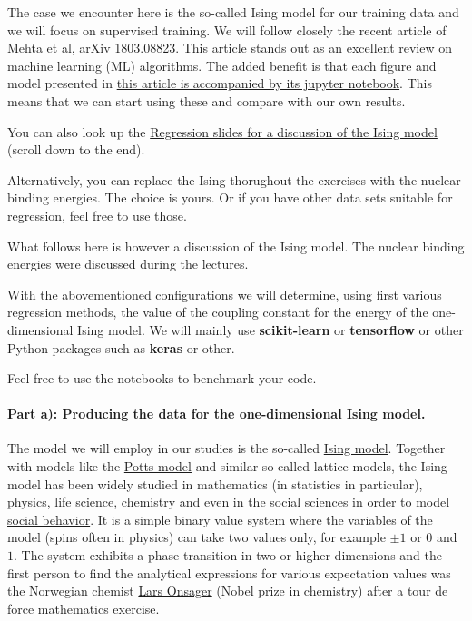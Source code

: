 \documentclass[%
oneside,                 %
final,                   %
10pt]{article}
\begin{document}
The case we encounter here
is  the so-called Ising model for  our training data and we will
focus on supervised training. We will follow closely the recent
article of \href{{https://arxiv.org/abs/1803.08823}}{Mehta et al, arXiv
1803.08823}. This article stands
out as an excellent review on machine learning (ML) algorithms.
The added benefit is that each figure and
model presented in \href{{https://physics.bu.edu/~pankajm/MLnotebooks.html}}{this article is accompanied by its jupyter
notebook}. This
means that we can start using these and compare with our own results.

You can also look up the \href{{https://compphysics.github.io/MachineLearningMSU-FRIB2020/doc/pub/Regression/html/Regression.html}}{Regression slides for a discussion of the Ising model} (scroll down to the end).

Alternatively, you can replace the Ising thorughout the exercises with the nuclear binding energies. The choice is yours. Or if you have other data sets suitable for regression, feel free to use those.

What follows here is however a discussion of the Ising model. The nuclear binding energies were discussed during the lectures.

With the abovementioned configurations we will determine, using first
various regression methods, the value of the coupling constant for the
energy of the one-dimensional Ising model.
We will mainly use \textbf{scikit-learn} or \textbf{tensorflow} or other Python packages such as \textbf{keras} or other.

Feel free to use the notebooks to benchmark your code.  

\paragraph{Part a): Producing the data for the one-dimensional Ising model.}
The model we will employ in our studies is the so-called \href{{https://en.wikipedia.org/wiki/Ising_model}}{Ising
model}.  Together with
models like the \href{{https://en.wikipedia.org/wiki/Potts_model}}{Potts
model} and similar
so-called lattice models, the Ising model has been widely studied in
mathematics (in statistics in particular), physics, \href{{https://journals.aps.org/pre/abstract/10.1103/PhysRevE.93.062402}}{life
science},
chemistry and even in the \href{{https://www.springer.com/gp/book/9781461420316}}{social sciences in order to model social
behavior}. It is a
simple binary value system where the variables of the model (spins often in
physics) can take two values only, for example $\pm 1$ or $0$ and $1$.
The system exhibits a phase transition in two or higher dimensions and
the first person to find the analytical expressions for various
expectation values was the Norwegian chemist \href{{https://en.wikipedia.org/wiki/Lars_Onsager}}{Lars
Onsager} (Nobel prize in
chemistry) after a tour de force mathematics exercise.
\end{document}

